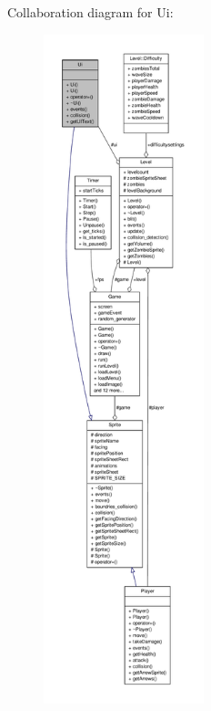Collaboration diagram for Ui\-:
\nopagebreak
\begin{figure}[H]
\begin{center}
\leavevmode
\includegraphics[height=550pt]{classUi__coll__graph}
\end{center}
\end{figure}
